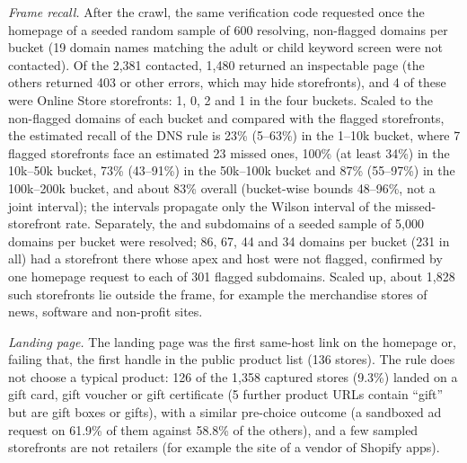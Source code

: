 \documentclass[preprint,11pt,authoryear,a4paper]{elsarticle}
\begin{document}
\emph{Frame recall.} After the crawl, the same verification code requested once the homepage of a seeded random sample of 600 resolving, non-flagged domains per bucket (19 domain names matching the adult or child keyword screen were not contacted). Of the 2,381 contacted, 1,480 returned an inspectable page (the others returned 403 or other errors, which may hide storefronts), and 4 of these were Online Store storefronts: 1, 0, 2 and 1 in the four buckets. Scaled to the non-flagged domains of each bucket and compared with the flagged storefronts, the estimated recall of the DNS rule is 23\% (5--63\%) in the 1--10k bucket, where 7 flagged storefronts face an estimated 23 missed ones, 100\% (at least 34\%) in the 10k--50k bucket, 73\% (43--91\%) in the 50k--100k bucket and 87\% (55--97\%) in the 100k--200k bucket, and about 83\% overall (bucket-wise bounds 48--96\%, not a joint interval); the intervals propagate only the Wilson interval of the missed-storefront rate. Separately, the  and  subdomains of a seeded sample of 5,000 domains per bucket were resolved; 86, 67, 44 and 34 domains per bucket (231 in all) had a storefront there whose apex and  host were not flagged, confirmed by one homepage request to each of 301 flagged subdomains. Scaled up, about 1,828 such storefronts lie outside the frame, for example the merchandise stores of news, software and non-profit sites.

\emph{Landing page.} The landing page was the first same-host  link on the homepage or, failing that, the first handle in the public product list (136 stores). The rule does not choose a typical product: 126 of the 1,358 captured stores (9.3\%) landed on a gift card, gift voucher or gift certificate (5 further product URLs contain ``gift'' but are gift boxes or gifts), with a similar pre-choice outcome (a sandboxed ad request on 61.9\% of them against 58.8\% of the others), and a few sampled storefronts are not retailers (for example the site of a vendor of Shopify apps).
\end{document}

